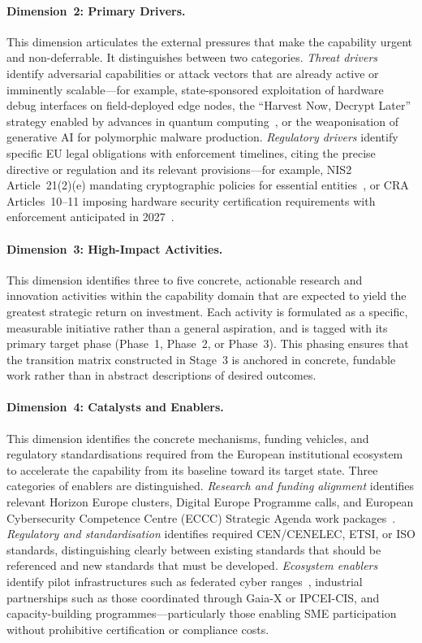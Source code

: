 \paragraph{Dimension~2: Primary Drivers.}
This dimension articulates the external pressures that make the capability urgent and non-deferrable. It distinguishes between two categories. \textit{Threat drivers} identify adversarial capabilities or attack vectors that are already active or imminently scalable---for example, state-sponsored exploitation of hardware debug interfaces on field-deployed edge nodes, the ``Harvest Now, Decrypt Later'' strategy enabled by advances in quantum computing~\cite{nistir8413}, or the weaponisation of generative AI for polymorphic malware production. \textit{Regulatory drivers} identify specific EU legal obligations with enforcement timelines, citing the precise directive or regulation and its relevant provisions---for example, NIS2 Article~21(2)(e) mandating cryptographic policies for essential entities~\cite{nis2}, or CRA Articles~10--11 imposing hardware security certification requirements with enforcement anticipated in 2027~\cite{cra}.

\paragraph{Dimension~3: High-Impact Activities.}
This dimension identifies three to five concrete, actionable research and innovation activities within the capability domain that are expected to yield the greatest strategic return on investment. Each activity is formulated as a specific, measurable initiative rather than a general aspiration, and is tagged with its primary target phase (Phase~1, Phase~2, or Phase~3). This phasing ensures that the transition matrix constructed in Stage~3 is anchored in concrete, fundable work rather than in abstract descriptions of desired outcomes.

\paragraph{Dimension~4: Catalysts and Enablers.}
This dimension identifies the concrete mechanisms, funding vehicles, and regulatory standardisations required from the European institutional ecosystem to accelerate the capability from its baseline toward its target state. Three categories of enablers are distinguished. \textit{Research and funding alignment} identifies relevant Horizon Europe clusters, Digital Europe Programme calls, and European Cybersecurity Competence Centre (ECCC) Strategic Agenda work packages~\cite{eccc}. \textit{Regulatory and standardisation} identifies required CEN/CENELEC, ETSI, or ISO standards, distinguishing clearly between existing standards that should be referenced and new standards that must be developed. \textit{Ecosystem enablers} identify pilot infrastructures such as federated cyber ranges~\cite{concordia}, industrial partnerships such as those coordinated through Gaia-X or IPCEI-CIS, and capacity-building programmes---particularly those enabling SME participation without prohibitive certification or compliance costs.

